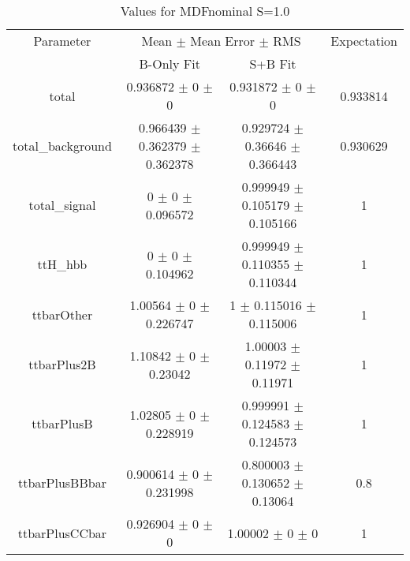 \begin{table}
\centering
\caption{Values for MDFnominal S=1.0}
\begin{tabular}{cccc}
\toprule
Parameter & \multicolumn{2}{c}{Mean $\pm$ Mean Error $\pm$ RMS} & Expectation\\
 & B-Only Fit & S+B Fit & \\
\midrule
total & \num{0.936872} $\pm$ \num{0} $\pm$ \num{0} & \num{0.931872} $\pm$ \num{0} $\pm$ \num{0} & \num{0.933814}\\
total\_background & \num{0.966439} $\pm$ \num{0.362379} $\pm$ \num{0.362378} & \num{0.929724} $\pm$ \num{0.36646} $\pm$ \num{0.366443} & \num{0.930629}\\
total\_signal & \num{0} $\pm$ \num{0} $\pm$ \num{0.096572} & \num{0.999949} $\pm$ \num{0.105179} $\pm$ \num{0.105166} & \num{1}\\
ttH\_hbb & \num{0} $\pm$ \num{0} $\pm$ \num{0.104962} & \num{0.999949} $\pm$ \num{0.110355} $\pm$ \num{0.110344} & \num{1}\\
ttbarOther & \num{1.00564} $\pm$ \num{0} $\pm$ \num{0.226747} & \num{1} $\pm$ \num{0.115016} $\pm$ \num{0.115006} & \num{1}\\
ttbarPlus2B & \num{1.10842} $\pm$ \num{0} $\pm$ \num{0.23042} & \num{1.00003} $\pm$ \num{0.11972} $\pm$ \num{0.11971} & \num{1}\\
ttbarPlusB & \num{1.02805} $\pm$ \num{0} $\pm$ \num{0.228919} & \num{0.999991} $\pm$ \num{0.124583} $\pm$ \num{0.124573} & \num{1}\\
ttbarPlusBBbar & \num{0.900614} $\pm$ \num{0} $\pm$ \num{0.231998} & \num{0.800003} $\pm$ \num{0.130652} $\pm$ \num{0.13064} & \num{0.8}\\
ttbarPlusCCbar & \num{0.926904} $\pm$ \num{0} $\pm$ \num{0} & \num{1.00002} $\pm$ \num{0} $\pm$ \num{0} & \num{1}\\
\bottomrule
\end{tabular}
\end{table}